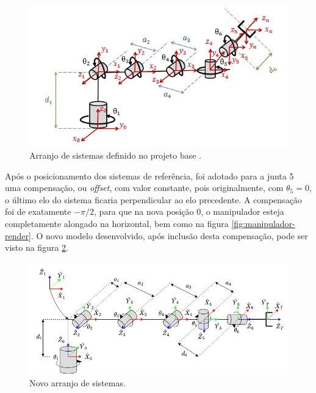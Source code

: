 \begin{figure}[htb]
    \caption{Arranjo de sistemas definido no projeto base \cite{fernando2019assistivo}.}    
    \begin{centering}

        \includegraphics[width=0.8\columnwidth]{images/arm/Refframes-original.png}
    
    \par\end{centering}

    \label{fig:DH-Base}
\end{figure}

Após o posicionamento dos sistemas de referência, foi adotado para a junta 5 
uma compensação, ou \textit{offset},
com valor constante, pois originalmente, com $\theta_5=0$, o 
último elo do sistema ficaria perpendicular ao elo precedente. A compensação
foi de exatamente $-\pi/2$, para que na nova posição 0, o manipulador esteja 
completamente alongado na horizontal, bem como na figura \ref{fig:manipulador-render}.
O novo modelo desenvolvido, após inclusão desta compensação, pode ser visto na figura \ref{fig:DH-Novo}. 

\begin{figure}[htb]
    \caption{Novo arranjo de sistemas.}    
    \begin{centering}

        \includegraphics[width=0.8\columnwidth]{images/arm/RefFrames.png}
    
    \par\end{centering}

    \label{fig:DH-Novo}
\end{figure}

